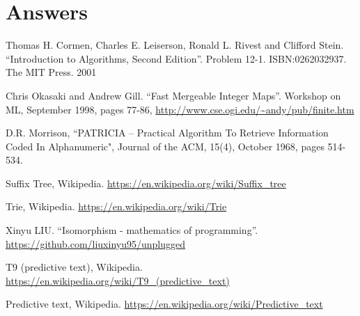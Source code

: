 \documentclass[b5paper]{article}
\begin{document}
\ifx\wholebook\relax \else
\section{Answers}
\shipoutAnswer

\begin{thebibliography}{99}

Thomas H. Cormen, Charles E. Leiserson, Ronald L. Rivest and Clifford Stein.
``Introduction to Algorithms, Second Edition''. Problem 12-1. ISBN:0262032937. The MIT Press. 2001

Chris Okasaki and Andrew Gill. ``Fast Mergeable Integer
Maps''. Workshop on ML, September 1998, pages 77-86, \url{http://www.cse.ogi.edu/~andy/pub/finite.htm}

D.R. Morrison, ``PATRICIA -- Practical Algorithm To Retrieve  Information Coded In Alphanumeric", Journal of the ACM, 15(4), October 1968, pages 514-534.

Suffix Tree, Wikipedia. \url{https://en.wikipedia.org/wiki/Suffix_tree}

Trie, Wikipedia. \url{https://en.wikipedia.org/wiki/Trie}

Xinyu LIU. ``Isomorphism - mathematics of programming''. \url{https://github.com/liuxinyu95/unplugged}

T9 (predictive text), Wikipedia. \url{https://en.wikipedia.org/wiki/T9_(predictive_text)}

Predictive text,
Wikipedia. \url{https://en.wikipedia.org/wiki/Predictive_text}

\end{thebibliography}

\expandafter\enddocument
\fi
\end{document}
